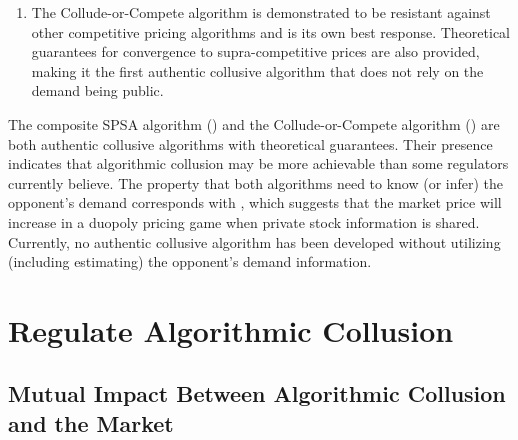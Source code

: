 \documentclass[mnsc,nonblindrev]{workingpaper}
\begin{document}
\begin{enumerate}
\begin{itemize}
            \item Second, the price can reveal timing information to synchronize the switching of the two modules for the two firms. It can be observed that the collusive module can only learn the collusive prices when both firms start using the collusive module simultaneously. In fact, during the first two time periods of the collusive module, the algorithm charges $p_{start,i}$ and $\kappa p_{start,i}$, where $0<\kappa<1$ is a fixed constant. Although $\kappa$ is unknown to the opponent, this structured pricing data can help opponents learn the timing of the beginning of the collusive module.
        \end{itemize}
    \item The Collude-or-Compete algorithm is demonstrated to be resistant against other competitive pricing algorithms and is its own best response. Theoretical guarantees for convergence to supra-competitive prices are also provided, making it the first authentic collusive algorithm that does not rely on the demand being public.
\end{enumerate}

The composite SPSA algorithm (\cite{meylahn2022learning}) and the Collude-or-Compete algorithm (\cite{loots2023data}) are both authentic collusive algorithms with theoretical guarantees. Their presence indicates that algorithmic collusion may be more achievable than some regulators currently believe. The property that both algorithms need to know (or infer) the opponent's demand corresponds with \cite{garcia2023dynamic}, which suggests that the market price will increase in a duopoly pricing game when private stock information is shared. Currently, no authentic collusive algorithm has been developed without utilizing (including estimating) the opponent's demand information.

\section{Regulate Algorithmic Collusion}
\label{sec:reglate}

\subsection{Mutual Impact Between Algorithmic Collusion and the Market}
\label{subsec:impact}
\end{document}
